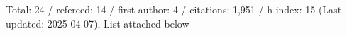 Total: 24 / refereed: 14 / first author: 4 / citations: 1,951 / h-index: 15 (Last updated: 2025-04-07), List attached below